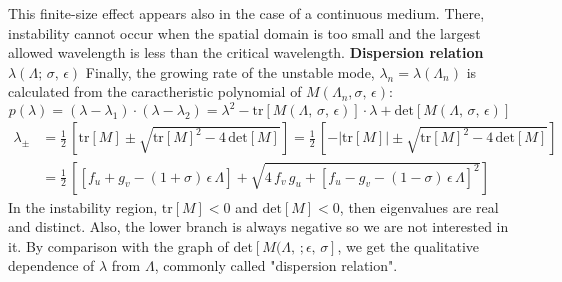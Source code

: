 This finite-size effect appears also in the case of a continuous medium. There, instability cannot occur when the spatial domain is too small and the largest allowed wavelength is less than the critical wavelength.
\medskip \newline
\textbf{Dispersion relation $\lambda(\Lambda;\, \sigma,\,\epsilon)$} \newline
Finally, the growing rate of the unstable mode, $\lambda_n = \lambda(\Lambda_n)$ is calculated from the caractheristic polynomial of $M(\Lambda_n, \sigma,\,\epsilon)$:
\begin{equation*}
    p(\lambda) = (\lambda-\lambda_1)\cdot(\lambda-\lambda_2) = \lambda^2 - \text{tr}[M(\Lambda,\,\sigma,\,\epsilon)]\cdot \lambda + \text{det}[M(\Lambda,\,\sigma,\,\epsilon)]
\end{equation*}
\begin{align*}
    \lambda_{\pm} &=\frac{1}{2}\,\left[\text{tr}[M]\pm \sqrt{\text{tr}[M]^2-4\,\text{det}[M]}\right] = \frac{1}{2}\,\left[-|\text{tr}[M]|\pm \sqrt{\text{tr}[M]^2-4\,\text{det}[M]}\right] \\
    &= \frac{1}{2}\, \left[\left[f_u + g_v - (1+\sigma)\,\epsilon\,\Lambda\right] + \sqrt{4\,f_v\,g_u + \left[f_u - g_v -(1-\sigma)\,\epsilon\,\Lambda\right]^2}\right]
\end{align*}
In the instability region, $\text{tr}[M] <0$ and $\text{det}[M]<0$, then eigenvalues are real and distinct. Also, the lower branch is always negative so we are not interested in it. By comparison with the graph of $\text{det}[M(\Lambda,\,;\epsilon,\,\sigma]$, we get the qualitative dependence of $\lambda$ from $\Lambda$, commonly called "dispersion relation".
\newpage
